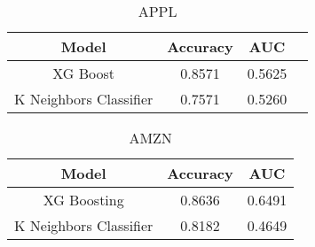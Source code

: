 \documentclass{article}
\title{}
\author{}
\date{}
\begin{document}
\maketitle

\begin{table}[h]
\centering
\begin{tabular}{cccc}
\hline
\textbf{Model} & \textbf{Accuracy} & \textbf{AUC}  \\ \hline
XG Boost &    0.8571 & 0.5625 \\
K Neighbors Classifier &    0.7571 & 0.5260 \\\hline
\end{tabular}
\caption{APPL}
\end{table}

\begin{table}[h]
\centering
\begin{tabular}{ccc}
\hline
\textbf{Model} & \textbf{Accuracy} & \textbf{AUC} \\ \hline
XG Boosting & 0.8636 & 0.6491 \\
K Neighbors Classifier & 0.8182 & 0.4649 \\ \hline
\end{tabular}
\caption{AMZN}
\end{table}
\end{document}
